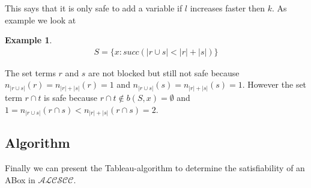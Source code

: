 \documentclass[a4paper,11pt]{scrartcl}
\theoremstyle{break}
\theoremstyle{definition}
\newtheorem{ex}{Example}
\begin{document}
This says that it is only safe to add a variable if $l$ increases faster then $k$.
As example we look at 
\begin{ex}
\begin{align*}
S=\{x:succ(|r\cup s|<|r|+|s|)\}
\end{align*}
\end{ex}
The set terms $r$ and $s$ are not blocked but still not safe because $n_{|r\cup s|}(r)=n_{|r|+|s|}(r)=1$ and $n_{|r\cup s|}(s)=n_{|r|+|s|}(s)=1$. However the set term $r\cap t$ is safe because $r\cap t\notin b(S,x)=\emptyset$ and $1=n_{|r\cup s|}(r\cap s)<n_{|r|+|s|}(r\cap s)=2$. 
\subsection{Algorithm}
Finally we can present the Tableau-algorithm to determine the satisfiability of an ABox in $\mathcal{ALCSCC}$.
\end{document}
